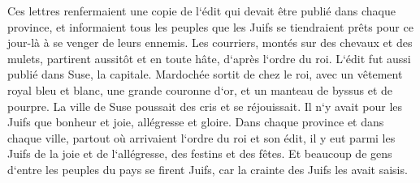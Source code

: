 \verse Ces lettres renfermaient une copie de l`édit qui devait être publié dans chaque province, et informaient tous les peuples que les Juifs se tiendraient prêts pour ce jour-là à se venger de leurs ennemis. 
\verse Les courriers, montés sur des chevaux et des mulets, partirent aussitôt et en toute hâte, d`après l`ordre du roi. L`édit fut aussi publié dans Suse, la capitale. 
\verse Mardochée sortit de chez le roi, avec un vêtement royal bleu et blanc, une grande couronne d`or, et un manteau de byssus et de pourpre. La ville de Suse poussait des cris et se réjouissait. 
\verse Il n`y avait pour les Juifs que bonheur et joie, allégresse et gloire. 
\verse Dans chaque province et dans chaque ville, partout où arrivaient l`ordre du roi et son édit, il y eut parmi les Juifs de la joie et de l`allégresse, des festins et des fêtes. Et beaucoup de gens d`entre les peuples du pays se firent Juifs, car la crainte des Juifs les avait saisis. 

\chapter{}

